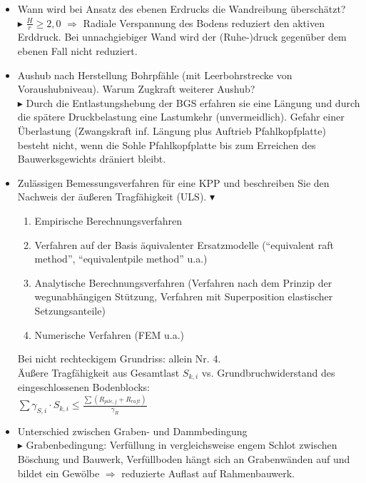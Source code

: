 \documentclass[fleqn,twoside]{article}
\begin{document}
\begin{itemize}
    \item Wann wird bei Ansatz des ebenen Erdrucks die Wandreibung überschätzt?\\
    $\blacktriangleright$ $\frac{H}{r} \geq 2,0$ $\Rightarrow$ Radiale Verspannung des Bodens reduziert den aktiven Erddruck. Bei unnachgiebiger Wand wird der (Ruhe-)druck gegenüber dem ebenen Fall nicht reduziert.
    \item Aushub nach Herstellung Bohrpfähle (mit Leerbohrstrecke von Voraushubniveau). Warum Zugkraft weiterer Aushub?\\
        $\blacktriangleright$ Durch die Entlastungshebung der BGS erfahren sie eine Längung und durch die spätere Druckbelastung eine Lastumkehr (unvermeidlich). Gefahr einer Überlastung (Zwangskraft inf. Längung plus Auftrieb Pfahlkopfplatte) besteht nicht, wenn die Sohle Pfahlkopfplatte bis zum Erreichen des Bauwerksgewichts dräniert bleibt.
    \item Zulässigen Bemessungsverfahren für eine KPP und beschreiben Sie den Nachweis der äußeren Tragfähigkeit (ULS). $\blacktriangledown$
        \begin{enumerate}
            \item Empirische Berechnungsverfahren
            \item Verfahren auf der Basis äquivalenter Ersatzmodelle (\enquote{equivalent raft method}, \enquote{equivalentpile method} u.a.)
            \item Analytische Berechnungsverfahren (Verfahren nach dem Prinzip der wegunabhängigen Stützung, Verfahren mit Superposition elastischer Setzungsanteile)
            \item Numerische Verfahren (FEM u.a.)
        \end{enumerate}
        Bei nicht rechteckigem Grundriss: allein Nr. 4.\\
        Äußere Tragfähigkeit aus Gesamtlast $S_{k,i}$ vs. Grundbruchwiderstand des eingeschlossenen Bodenblocks:\\
        $\sum \gamma_{S,i} \cdot S_{k,i} \leq \frac{\sum (R_{pile,j} + R_{raft} )}{\gamma_{R}} $
    \item Unterschied zwischen Graben- und Dammbedingung\\
        $\blacktriangleright$ Grabenbedingung: Verfüllung in vergleichsweise engem Schlot zwischen Böschung und Bauwerk, Verfüllboden hängt sich an Grabenwänden auf und bildet ein Gewölbe $\Rightarrow$ reduzierte Auflast auf Rahmenbauwerk.\\

\end{itemize}
\end{document}
